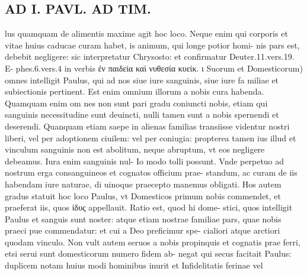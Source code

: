 \documentclass{article}
\begin{document}
\begin{pages}
\section*{AD I. PAVL. AD TIM. }
\marginpar{[ p.266 ]}\pstart lus quamquam de alimentis maxime agit hoc loco. Neque enim qui corporis et vitae huius caducae curam habet, is animum, qui longe potior homi- nis pars est, debebit negligere: sic interpretatur Chrysosto: et confirmatur Deuter.11.vers.19. E- phes.6.vers.4 in verbis ἐν παιδεία καὶ νυθεσία κυείκ. ι Suorum et Domesticorum) omnes intelligit Paulus, qui ad nos siue iure sanguinis, siue iure fa miliae et subiectionis pertinent. Est enim omnium illorum a nobis cura habenda. Quamquam enim om nes non sunt pari gradu coniuncti nobis, etiam qui sanguinis necessitudine sunt deuincti, nulli tamen sunt a nobis spernendi et deserendi. Quanquam etiam saepe in alienas familias transiisse videntur nostri liberi, vel per adoptionem ciuilem: vel per coniugia: propterea tamen ius illud et vinculum sanguinis non est abolitum, neque abruptum, vt eos negligere debeamus. Iura enim sanguinis nul- Io modo tolli possunt. Vnde perpetuo ad nostrum erga consanguineos et cognatos officium prae- standum, ac curam de iis habendam iure naturae, di uinoque praecepto manemus obligati. Hos autem gradus statuit hoc loco Paulus, vt Domesticos primum nobis commendet, et praeferat iis, quos ἰδυς appellauit. Ratio est, quod hi dome- stici, quos intelligit Paulus et sanguis sunt noster: atque etiam nostrae familiae pars, quae nobis praeci pue commendatur: et cui a Deo preficimur spe- cialiori atque arctiori quodam vinculo. Non vult autem seruos a nobis propinquis et cognatis prae ferri, etsi serui sunt domesticorum numero fidem ab- negat qui secus facitait Paulus: duplicem notam huius modi hominibus inurit et Infidelitatis ferinae vel  \pend

\end{pages}
\end{document}
